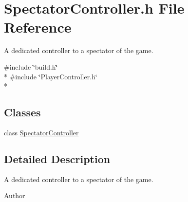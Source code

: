 \section{Spectator\-Controller.\-h File Reference}
\label{_spectator_controller_8h}


A dedicated controller to a spectator of the game.  


{\ttfamily \#include \char`\"{}build.\-h\char`\"{}}\\*
{\ttfamily \#include \char`\"{}Player\-Controller.\-h\char`\"{}}\\*
\subsection*{Classes}
\begin{DoxyCompactItemize}
\item 
class \hyperlink{class_spectator_controller}{Spectator\-Controller}
\end{DoxyCompactItemize}


\subsection{Detailed Description}
A dedicated controller to a spectator of the game. \begin{DoxyAuthor}{Author}

\end{DoxyAuthor}
